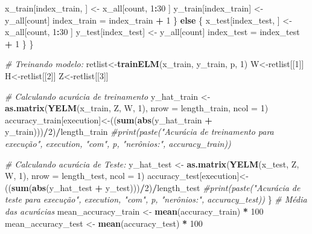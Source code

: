 \documentclass[
]{article}
\newenvironment{Shaded}{\begin{snugshade}}{\end{snugshade}}
\newcommand{\CommentTok}[1]{\textcolor[rgb]{0.56,0.35,0.01}{\textit{#1}}}
\newcommand{\ControlFlowTok}[1]{\textcolor[rgb]{0.13,0.29,0.53}{\textbf{#1}}}
\newcommand{\DataTypeTok}[1]{\textcolor[rgb]{0.13,0.29,0.53}{#1}}
\newcommand{\DecValTok}[1]{\textcolor[rgb]{0.00,0.00,0.81}{#1}}
\newcommand{\KeywordTok}[1]{\textcolor[rgb]{0.13,0.29,0.53}{\textbf{#1}}}
\newcommand{\NormalTok}[1]{#1}
\newcommand{\OperatorTok}[1]{\textcolor[rgb]{0.81,0.36,0.00}{\textbf{#1}}}
\newcommand{\StringTok}[1]{\textcolor[rgb]{0.31,0.60,0.02}{#1}}
\begin{document}
\begin{Shaded}
\begin{Highlighting}[]
\NormalTok{        x_train[index_train, ] <-}\StringTok{ }\NormalTok{x_all[count, }\DecValTok{1}\OperatorTok{:}\DecValTok{30}\NormalTok{ ]}
\NormalTok{        y_train[index_train] <-}\StringTok{ }\NormalTok{y_all[count]}
\NormalTok{        index_train =}\StringTok{ }\NormalTok{index_train }\OperatorTok{+}\StringTok{ }\DecValTok{1}
\NormalTok{      \} }\ControlFlowTok{else}\NormalTok{ \{}
\NormalTok{        x_test[index_test, ] <-}\StringTok{ }\NormalTok{x_all[count, }\DecValTok{1}\OperatorTok{:}\DecValTok{30}\NormalTok{ ]}
\NormalTok{        y_test[index_test] <-}\StringTok{ }\NormalTok{y_all[count]}
\NormalTok{        index_test =}\StringTok{ }\NormalTok{index_test }\OperatorTok{+}\StringTok{ }\DecValTok{1}    
\NormalTok{      \}}
\NormalTok{    \}}
    
    \CommentTok{# Treinando modelo:}
\NormalTok{    retlist<-}\KeywordTok{trainELM}\NormalTok{(x_train, y_train, p, }\DecValTok{1}\NormalTok{)}
\NormalTok{    W<-retlist[[}\DecValTok{1}\NormalTok{]]}
\NormalTok{    H<-retlist[[}\DecValTok{2}\NormalTok{]]}
\NormalTok{    Z<-retlist[[}\DecValTok{3}\NormalTok{]]}
    
    \CommentTok{# Calculando acurácia de treinamento}
\NormalTok{    y_hat_train <-}\StringTok{ }\KeywordTok{as.matrix}\NormalTok{(}\KeywordTok{YELM}\NormalTok{(x_train, Z, W, }\DecValTok{1}\NormalTok{), }\DataTypeTok{nrow =}\NormalTok{ length_train, }\DataTypeTok{ncol =} \DecValTok{1}\NormalTok{)}
\NormalTok{    accuracy_train[execution]<-((}\KeywordTok{sum}\NormalTok{(}\KeywordTok{abs}\NormalTok{(y_hat_train }\OperatorTok{+}\StringTok{ }\NormalTok{y_train)))}\OperatorTok{/}\DecValTok{2}\NormalTok{)}\OperatorTok{/}\NormalTok{length_train}
    \CommentTok{#print(paste("Acurácia de treinamento para execução", execution, "com", p, "nerônios:", accuracy_train))}
    
    \CommentTok{# Calculando acurácia de Teste:}
\NormalTok{    y_hat_test <-}\StringTok{ }\KeywordTok{as.matrix}\NormalTok{(}\KeywordTok{YELM}\NormalTok{(x_test, Z, W, }\DecValTok{1}\NormalTok{), }\DataTypeTok{nrow =}\NormalTok{ length_test, }\DataTypeTok{ncol =} \DecValTok{1}\NormalTok{)}
\NormalTok{    accuracy_test[execution]<-((}\KeywordTok{sum}\NormalTok{(}\KeywordTok{abs}\NormalTok{(y_hat_test }\OperatorTok{+}\StringTok{ }\NormalTok{y_test)))}\OperatorTok{/}\DecValTok{2}\NormalTok{)}\OperatorTok{/}\NormalTok{length_test}
    \CommentTok{#print(paste("Acurácia de teste para execução", execution, "com", p, "nerônios:", accuracy_test))}
\NormalTok{  \}}
  \CommentTok{# Média das acurácias}
\NormalTok{  mean_accuracy_train <-}\StringTok{ }\KeywordTok{mean}\NormalTok{(accuracy_train) }\OperatorTok{*}\StringTok{ }\DecValTok{100}
\NormalTok{  mean_accuracy_test <-}\StringTok{ }\KeywordTok{mean}\NormalTok{(accuracy_test) }\OperatorTok{*}\StringTok{ }\DecValTok{100}
  

\end{Highlighting}
\end{Shaded}
\end{document}
